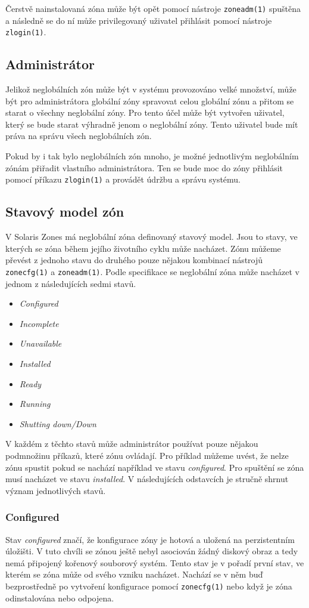 Čerstvě nainstalovaná zóna může být opět pomocí nástroje \verb|zoneadm(1)| spuštěna a následně se do ní může privilegovaný 
uživatel přihlásit pomocí nástroje \verb|zlogin(1)|.
\subsection{Administrátor}
\label{chapter:zones:administration:administrator}
Jelikož neglobálních zón může být v systému provozováno velké množství, může být pro administrátora globální zóny spravovat 
celou globální zónu a přitom se starat o všechny neglobální zóny. Pro tento účel může být vytvořen uživatel, který se bude
starat výhradně jenom o neglobální zóny. Tento uživatel bude mít práva na správu všech neglobálních zón.

Pokud by i tak bylo neglobálních zón mnoho, je možné jednotlivým neglobálním zónám přiřadit vlastního administrátora. Ten
se bude moc do zóny přihlásit pomocí příkazu \verb|zlogin(1)| a provádět údržbu a správu systému.
\subsection{Stavový model zón}
\label{chapter:zones:administration:states}
V Solaris Zones má neglobální zóna definovaný stavový model. Jsou to stavy, ve kterých se zóna během jejího životního cyklu
může nacházet. Zónu můžeme převést z jednoho stavu do druhého pouze nějakou kombinací nástrojů \verb|zonecfg(1)| a
\verb|zoneadm(1)|. Podle specifikace \cite{oracle:solaris:zones:states} se neglobální zóna může nacházet v jednom z
následujících sedmi stavů.
\begin{itemize}
 \item \textit{Configured}
 \item \textit{Incomplete}
 \item \textit{Unavailable}
 \item \textit{Installed}
 \item \textit{Ready}
 \item \textit{Running}
 \item \textit{Shutting down/Down}
\end{itemize}
V každém z těchto stavů může administrátor používat pouze nějakou podmnožinu příkazů, které zónu ovládají. Pro příklad
můžeme uvést, že nelze zónu spustit pokud se nachází například ve stavu \textit{configured}. Pro spuštění se zóna musí nacházet
ve stavu \textit{installed}. V následujících odstavcích je stručně shrnut význam jednotlivých stavů.
\subsubsection{Configured}
\label{chapter:zones:administration:states:configured}
Stav \textit{configured} značí, že konfigurace zóny je hotová a uložená na perzistentním úložišti. V tuto chvíli se zónou
ještě nebyl asociován žádný diskový obraz a tedy nemá připojený kořenový souborový systém. Tento stav je v pořadí první stav,
ve kterém se zóna může od svého vzniku nacházet. Nachází se v něm buď bezprostředně po vytvoření konfigurace pomocí \verb|zonecfg(1)|
nebo když je zóna odinstalována nebo odpojena.

